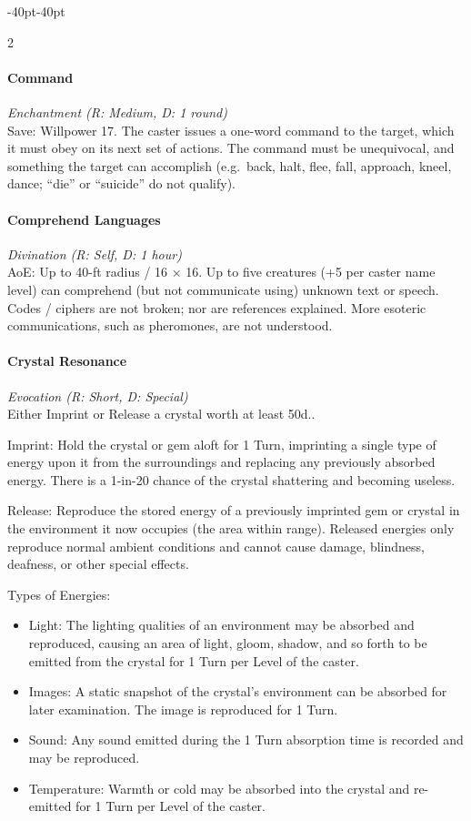 \documentclass{book}
\providecommand{\tightlist}{%
\setlength{\itemsep}{0pt}\setlength{\parskip}{0pt}}
\begin{document}
\begin{adjustwidth}{-40pt}{-40pt}
\begin{multicols}{2}
\paragraph{Command}\label{command}
\emph{Enchantment (R: Medium, D: 1 round)}\\
Save: Willpower 17. The caster issues a one-word command to the target,
which it must obey on its next set of actions. The command must be
unequivocal, and something the target can accomplish (e.g.~back, halt,
flee, fall, approach, kneel, dance; ``die'' or ``suicide'' do not
qualify).

\paragraph{Comprehend Languages}\label{comprehend-languages}
\emph{Divination (R: Self, D: 1 hour)}\\
AoE: Up to 40-ft radius / 16 × 16. Up to five creatures (+5 per caster
name level) can comprehend (but not communicate using) unknown text or
speech. Codes / ciphers are not broken; nor are references explained.
More esoteric communications, such as pheromones, are not understood.

\paragraph{Crystal Resonance}\label{crystal-resonance}
\emph{Evocation (R: Short, D: Special)}\\
Either Imprint or Release a crystal worth at least 50d..

Imprint: Hold the crystal or gem aloft for 1 Turn, imprinting a single
type of energy upon it from the surroundings and replacing any
previously absorbed energy. There is a 1-in-20 chance of the crystal
shattering and becoming useless.

Release: Reproduce the stored energy of a previously imprinted gem or
crystal in the environment it now occupies (the area within range).
Released energies only reproduce normal ambient conditions and cannot
cause damage, blindness, deafness, or other special effects.

Types of Energies:

\begin{itemize}
	\tightlist
	\item
	Light: The lighting qualities of an environment may be absorbed and
	reproduced, causing an area of light, gloom, shadow, and so forth to
	be emitted from the crystal for 1 Turn per Level of the caster.
	\item
	Images: A static snapshot of the crystal's environment can be absorbed
	for later examination. The image is reproduced for 1 Turn.
	\item
	Sound: Any sound emitted during the 1 Turn absorption time is recorded
	and may be reproduced.
	\item
	Temperature: Warmth or cold may be absorbed into the crystal and
	re-emitted for 1 Turn per Level of the caster.
\end{itemize}


\end{multicols}
\end{adjustwidth}
\end{document}
